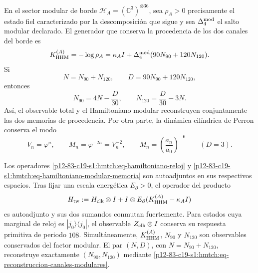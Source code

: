 En el sector modular de borde
\(\mathcal H_A=(\mathbb C^3)^{\otimes36}\), sea \(\rho_A>0\) precisamente
el estado fiel caracterizado por la descomposición que sigue y sea
\(\Delta_4^{\rm mod}\) el salto modular declarado. El generador que conserva
la procedencia de los dos canales del borde es
\begin{equation}
 K_{\rm HHM}^{(A)}=-\log\rho_A
 =\kappa_A I+\Delta_4^{\rm mod}(90N_{90}+120N_{120}).
 \label{p12-83-c19-s1:hmtch:eq-hamiltoniano-modular-memoria}
\end{equation}
Si
\[
 N=N_{90}+N_{120},
 \qquad
 D=90N_{90}+120N_{120},
\]
entonces
\begin{equation}
 N_{90}=4N-\frac{D}{30},
 \qquad
 N_{120}=\frac{D}{30}-3N.
 \label{p12-83-c19-s1:hmtch:eq-reconstruccion-canales-modulares}
\end{equation}
Así, el observable total y el Hamiltoniano modular reconstruyen
conjuntamente las dos memorias de procedencia. Por otra parte, la dinámica
cilíndrica de Perron conserva el modo
\begin{equation}
 V_n=\varphi^n,
 \qquad
 M_n=\varphi^{-2n}=V_n^{-2},
 \qquad
 M_n=\left(\frac{a_n}{a_0}\right)^{-6}\qquad(D=3).
 \label{p12-83-c19-s1:hmtch:eq-modo-estable-memoria}
\end{equation}

\begin{theorem}
\label{p12-83-c19-s1:hmtch:thm-composicion-calendario-memoria}
Los operadores
\eqref{p12-83-c19-s1:hmtch:eq-hamiltoniano-reloj} y
\eqref{p12-83-c19-s1:hmtch:eq-hamiltoniano-modular-memoria} son autoadjuntos en sus
respectivos espacios. Tras fijar una escala energética \(E_\partial>0\), el
operador del producto
\begin{equation}
 H_{\rm tw}
 :=H_{\rm clk}\otimes I
 +I\otimes E_\partial(K_{\rm HHM}^{(A)}-\kappa_A I)
 \label{p12-83-c19-s1:hmtch:eq-hamiltoniano-two-way-total}
\end{equation}
es autoadjunto y sus dos sumandos conmutan fuertemente. Para estados cuya
marginal de reloj es \(|j_0\rangle\langle j_0|\), el observable
\(Z_{\rm clk}\otimes I\) conserva su respuesta primitiva de periodo \(108\).
Simultáneamente, \(K_{\rm HHM}^{(A)}\), \(N_{90}\) y \(N_{120}\) son
observables conservados del factor modular. El par \((N,D)\), con
\(N=N_{90}+N_{120}\), reconstruye exactamente \((N_{90},N_{120})\) mediante
\eqref{p12-83-c19-s1:hmtch:eq-reconstruccion-canales-modulares}.
\end{theorem}

